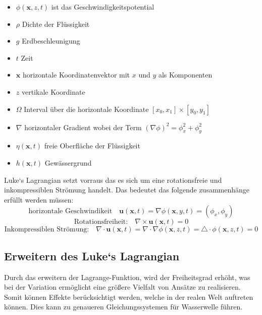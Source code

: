 \begin{itemize}
	\item
	$\phi(\bm{x},z,t)$ ist das Geschwindigkeitspotential
	\item
	$\rho$ Dichte der Flüssigkeit
	\item
	$g$ Erdbeschleunigung
	\item
	$t$ Zeit
	\item 
	$\bm{x}$ horizontale Koordinatenvektor mit $x$ und $y$ als Komponenten
	\item 
	$z$ vertikale Koordinate
	\item 
	$\Omega$ Interval über die horizontale Koordinate $[x_0,x_1]\times[y_0,y_1]$
	\item 
	$\nabla$ horizontaler Gradient wobei der Term $(\nabla \phi)^2 = \phi_x^2+\phi_y^2$
	\item 
	$\eta(\bm{x},t)$ freie Oberfläche der Flüssigkeit
	\item 
	$h(\bm{x},t)$ Gewässergrund 
	
\end{itemize}
Luke`s Lagrangian setzt vorraus das es sich um eine rotationsfreie und  inkompressiblen Strömung handelt.
Das bedeutet das folgende zusammenhänge erfüllt werden müssen:
\[
\text{horizontale Geschwindikeit}\quad \bm{u}(\bm{x},t) = \nabla \phi (\bm{x}, y, t) = \left(\phi_x, \phi_y\right)
\]
\[
\text{Rotationsfreiheit:}\quad \nabla \times \bm{u}(\bm{x},t) = 0
\]
\[
\text{Inkompressiblen Strömung:}\quad \nabla \cdot \bm{u}(\bm{x},t) = \nabla \cdot \nabla \phi(\bm{x}, z, t) = \triangle \cdot \phi(\bm{x}, z, t) = 0
\]

\subsection{Erweitern des Luke`s Lagrangian
	\label{luke:subsection:Erweitern}}

Durch das erweitern der Lagrange-Funktion, wird der Freiheitsgrad erhöht, was bei der Variation ermöglicht eine größere Vielfalt von Ansätze zu realisieren.
Somit können Effekte berücksichtigt werden, welche in der realen Welt auftreten können. Dies kann zu genaueren Gleichungssystemen für Wasserwelle führen.

